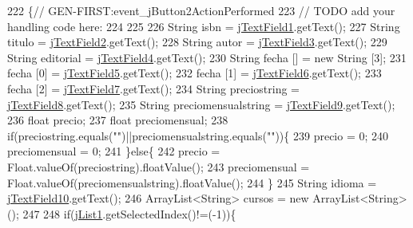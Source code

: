 \begin{DoxyCode}
222                                                                          \{\textcolor{comment}{//
      GEN-FIRST:event\_jButton2ActionPerformed}
223         \textcolor{comment}{// TODO add your handling code here:}
224         
225         
226         String isbn = \mbox{\hyperlink{class_interfaz_package_1_1_alta_diccionario_a36c60a7c341675a6d9588408d4babd4c}{jTextField1}}.getText();
227         String titulo = \mbox{\hyperlink{class_interfaz_package_1_1_alta_diccionario_ad64c1145064a7b09a9bc29cf43974b70}{jTextField2}}.getText();
228         String autor = \mbox{\hyperlink{class_interfaz_package_1_1_alta_diccionario_aae93f196d81a8be5120cd2e4a3968176}{jTextField3}}.getText();
229         String editorial = \mbox{\hyperlink{class_interfaz_package_1_1_alta_diccionario_a66e68fc19055b7af4fcac12091ab7c45}{jTextField4}}.getText();
230         String fecha [] = \textcolor{keyword}{new} String [3];
231         fecha [0] = \mbox{\hyperlink{class_interfaz_package_1_1_alta_diccionario_a56756a5f37a4a3056ce24d5570b99d61}{jTextField5}}.getText();
232         fecha [1] = \mbox{\hyperlink{class_interfaz_package_1_1_alta_diccionario_af4d8c6da79f9c1a9c5d4d8b9f70935c0}{jTextField6}}.getText();
233         fecha [2] = \mbox{\hyperlink{class_interfaz_package_1_1_alta_diccionario_a21d52c5fe53e1a05874c6771dc828a1d}{jTextField7}}.getText();
234         String preciostring = \mbox{\hyperlink{class_interfaz_package_1_1_alta_diccionario_a3e91b2eb94fa14f68ad137f48e0500f6}{jTextField8}}.getText();
235         String preciomensualstring = \mbox{\hyperlink{class_interfaz_package_1_1_alta_diccionario_a06c739f8e895e3be23782b6220a1bd91}{jTextField9}}.getText();
236         \textcolor{keywordtype}{float} precio;
237         \textcolor{keywordtype}{float} preciomensual;
238         \textcolor{keywordflow}{if}(preciostring.equals(\textcolor{stringliteral}{""})||preciomensualstring.equals(\textcolor{stringliteral}{""}))\{
239             precio = 0;
240             preciomensual = 0;
241         \}\textcolor{keywordflow}{else}\{
242         precio = Float.valueOf(preciostring).floatValue();
243         preciomensual = Float.valueOf(preciomensualstring).floatValue();
244         \}
245         String idioma = \mbox{\hyperlink{class_interfaz_package_1_1_alta_diccionario_a4fb32d82093d4c678abb7a5130e2cf23}{jTextField10}}.getText();
246         ArrayList<String> cursos = \textcolor{keyword}{new} ArrayList<String>();
247         
248         \textcolor{keywordflow}{if}(\mbox{\hyperlink{class_interfaz_package_1_1_alta_diccionario_a3d36802178dd91d9914cda26ede50e4e}{jList1}}.getSelectedIndex()!=(-1))\{

\end{DoxyCode}
